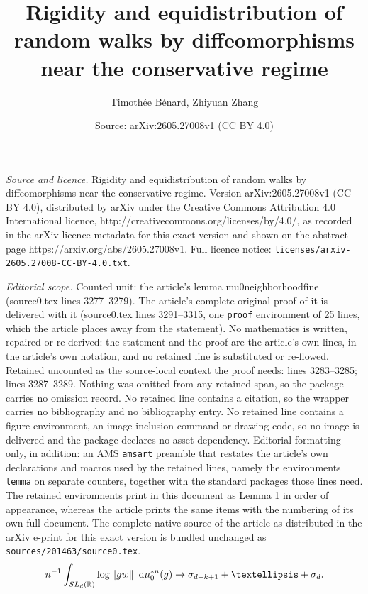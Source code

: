 \documentclass[10pt,a4paper]{amsart}
\title{Rigidity and equidistribution of random walks by diffeomorphisms near the conservative regime}
\author{Timoth\'ee B\'enard, Zhiyuan Zhang}
\date{Source: arXiv:2605.27008v1 (CC BY 4.0)}
\def \R{{\mathbb R}}
\def\SL{   {\rm SL}}
\newcommand{\dd}{\,\mathrm{d}}
\begin{document}
\maketitle

\noindent\emph{Source and licence.} Rigidity and equidistribution of random walks by diffeomorphisms near the conservative regime. Version arXiv:2605.27008v1 (CC BY 4.0), distributed by arXiv under the Creative Commons Attribution 4.0 International licence, http://creativecommons.org/licenses/by/4.0/, as recorded in the arXiv licence metadata for this exact version and shown on the abstract page https://arxiv.org/abs/2605.27008v1. Full licence notice: \texttt{licenses/arxiv-2605.27008-CC-BY-4.0.txt}.\par\smallskip

\noindent\textit{Editorial scope.} Counted unit: the article's lemma mu0neighborhoodfine (source0.tex lines 3277--3279). The article's complete original proof of it is delivered with it (source0.tex lines 3291--3315, one \texttt{proof} environment of 25 lines, which the article places away from the statement). No mathematics is written, repaired or re-derived: the statement and the proof are the article's own lines, in the article's own notation, and no retained line is substituted or re-flowed.  Retained uncounted as the source-local context the proof needs: lines 3283--3285; lines 3287--3289.  Nothing was omitted from any retained span, so the package carries no omission record.  No retained line contains a citation, so the wrapper carries no bibliography and no bibliography entry.  No retained line contains a figure environment, an image-inclusion command or drawing code, so no image is delivered and the package declares no asset dependency.  Editorial formatting only, in addition: an AMS \texttt{amsart} preamble that restates the article's own declarations and macros used by the retained lines, namely the environments \texttt{lemma} on separate counters, together with the standard packages those lines need.  The retained environments print in this document as Lemma 1 in order of appearance, whereas the article prints the same items with the numbering of its own full document.  The complete native source of the article as distributed in the arXiv e-print for this exact version is bundled unchanged as \texttt{sources/201463/source0.tex}.
			\begin{align}\label{eq-cv-L1-LLN}
				n^{-1}\int_{\SL_{d}(\R)} \log \|gw\| \,\,\dd\mu_{0}^{*n}(g) \rightarrow \sigma_{d-k+1}+\dots +\sigma_{d}.
			\end{align}
\end{document}
